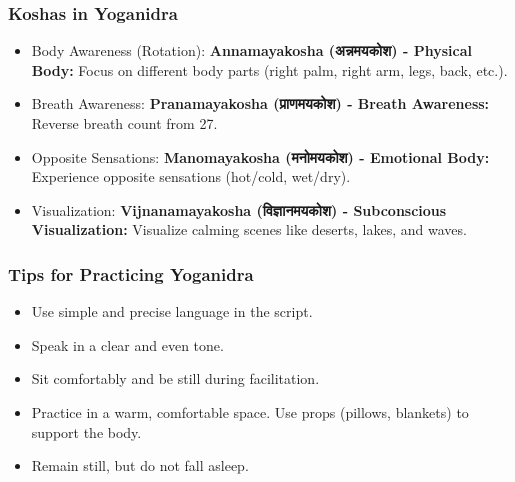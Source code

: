 \begin{frame}[fragile]\frametitle{Koshas in Yoganidra}
    
    \begin{itemize}
        \item Body Awareness (Rotation): \textbf{Annamayakosha (अन्नमयकोश) - Physical Body:} Focus on different body parts (right palm, right arm, legs, back, etc.).
        \item Breath Awareness: \textbf{Pranamayakosha (प्राणमयकोश) - Breath Awareness:} Reverse breath count from 27.
        \item Opposite Sensations: \textbf{Manomayakosha (मनोमयकोश) - Emotional Body:} Experience opposite sensations (hot/cold, wet/dry).
        \item Visualization: \textbf{Vijnanamayakosha (विज्ञानमयकोश) - Subconscious Visualization:} Visualize calming scenes like deserts, lakes, and waves.
    \end{itemize}
\end{frame}

\begin{frame}[fragile]\frametitle{Tips for Practicing Yoganidra}
    \begin{itemize}
        \item Use simple and precise language in the script.
        \item Speak in a clear and even tone.
        \item Sit comfortably and be still during facilitation.
        \item Practice in a warm, comfortable space. Use props (pillows, blankets) to support the body.
        \item Remain still, but do not fall asleep.
    \end{itemize}
\end{frame}
